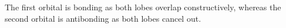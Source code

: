 \documentclass[main.tex]{subfiles}
\newcommand\chapterlabel{geometry}
\begin{document}
\begin{description}
%
 
 
 
 
The first orbital is bonding as both lobes overlap constructively, whereas the second orbital is antibonding as both lobes cancel out.




 



\end{description}
\end{document}
